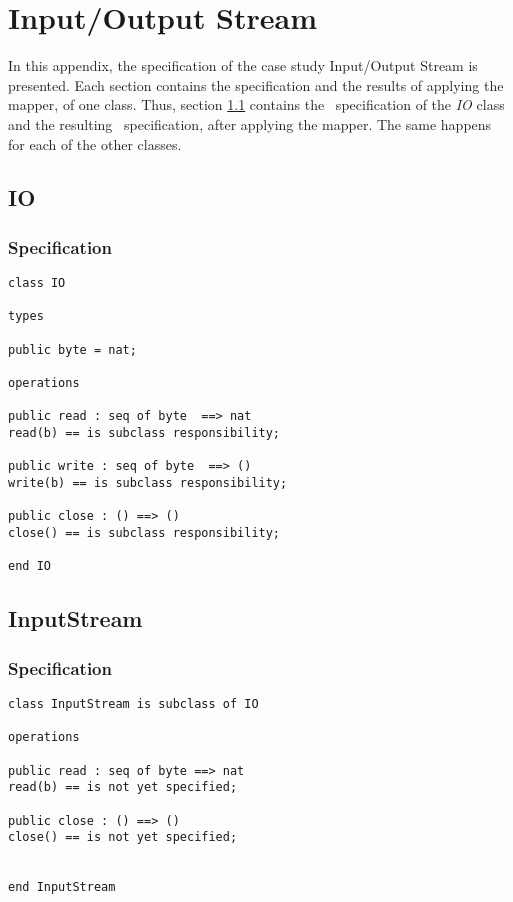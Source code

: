 \chapter{Input/Output Stream}
\label{appendix3}


In this appendix, the specification of the case study Input/Output Stream is presented. Each section contains the specification and the results of applying the mapper, of one class. Thus, section \ref{app3:io} contains the \vpp\ specification of the \textit{IO} class and the resulting \jml\ specification, after applying the mapper. The same happens for each of the other classes.


\section{IO}
\label{app3:io}

\subsection{Specification}

\lstset{style=mystyle}
\bigskip
\begin{lstlisting}
class IO

types

public byte = nat;

operations 

public read : seq of byte  ==> nat
read(b) == is subclass responsibility;

public write : seq of byte  ==> ()
write(b) == is subclass responsibility;

public close : () ==> ()
close() == is subclass responsibility;

end IO
\end{lstlisting}
\bigskip


\section{InputStream}

\subsection{Specification}

\lstset{style=mystyle}
\bigskip
\begin{lstlisting}
class InputStream is subclass of IO

operations

public read : seq of byte ==> nat
read(b) == is not yet specified;

public close : () ==> ()
close() == is not yet specified;


end InputStream
\end{lstlisting}
\bigskip


